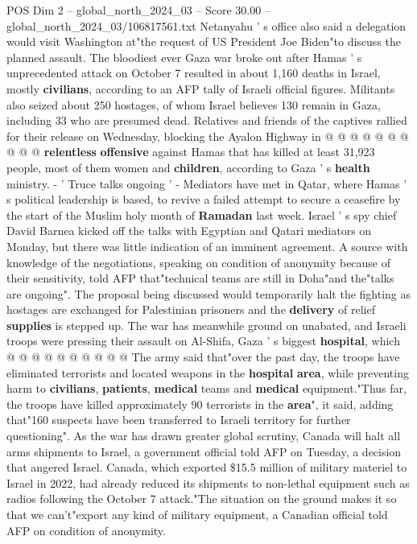\begin{textsample}{POS Dim 2 – global\_north\_2024\_03 – Score 30.00 – global\_north\_2024\_03/106817561.txt}
Netanyahu ' s office also said a delegation would visit Washington at"the request of US President Joe Biden"to discuss the planned assault.
The bloodiest ever Gaza war broke out after Hamas ' s unprecedented attack on October 7 resulted in about 1,160 deaths in Israel, mostly \textbf{civilians}, according to an AFP tally of Israeli official figures.
Militants also seized about 250 hostages, of whom Israel believes 130 remain in Gaza, including 33 who are presumed dead.
Relatives and friends of the captives rallied for their release on Wednesday, blocking the Ayalon Highway in @ @ @ @ @ @ @ @ @ @ \textbf{relentless} \textbf{offensive} against Hamas that has killed at least 31,923 people, most of them women and \textbf{children}, according to Gaza ' s \textbf{health} ministry. - ' Truce talks ongoing ' - Mediators have met in Qatar, where Hamas ' s political leadership is based, to revive a failed attempt to secure a ceasefire by the start of the Muslim holy month of \textbf{Ramadan} last week.
Israel ' s spy chief David Barnea kicked off the talks with Egyptian and Qatari mediators on Monday, but there was little indication of an imminent agreement.
A source with knowledge of the negotiations, speaking on condition of anonymity because of their sensitivity, told AFP that"technical teams are still in Doha"and the"talks are ongoing".
The proposal being discussed would temporarily halt the fighting as hostages are exchanged for Palestinian prisoners and the \textbf{delivery} of relief \textbf{supplies} is stepped up.
The war has meanwhile ground on unabated, and Israeli troops were pressing their assault on Al-Shifa, Gaza ' s biggest \textbf{hospital}, which @ @ @ @ @ @ @ @ @ @ The army said that"over the past day, the troops have eliminated terrorists and located weapons in the \textbf{hospital} \textbf{area}, while preventing harm to \textbf{civilians}, \textbf{patients}, \textbf{medical} teams and \textbf{medical} equipment."Thus far, the troops have killed approximately 90 terrorists in the \textbf{area}", it said, adding that"160 suspects have been transferred to Israeli territory for further questioning".
As the war has drawn greater global scrutiny, Canada will halt all arms shipments to Israel, a government official told AFP on Tuesday, a decision that angered Israel.
Canada, which exported \$15.5 million of military materiel to Israel in 2022, had already reduced its shipments to non-lethal equipment such as radios following the October 7 attack."The situation on the ground makes it so that we can't"export any kind of military equipment, a Canadian official told AFP on condition of anonymity.

\end{textsample}
